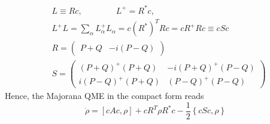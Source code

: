 \documentclass[a4paper,11pt]{article}
\theoremstyle{remark}
\newcommand{\ro}{\rho}
\newcommand{\nl}{\vskip 0.3cm}
\newcommand{\np}{\vskip 1.3cm}
\begin{document}
  \begin{subequations}
  \label{eq:quadr_lindb_majorana}
  \begin{align}
      &L    \equiv Rc, \quad \quad \quad \quad  L^+  = R^*c,\\
      &L^+L = \sum_{\alpha} L^+_{\alpha}L^{ }_{\alpha} = c(R^*)^TRc = cR^+Rc \equiv cSc \\[0.3 cm]
      &R = \left(\begin{array}{cc} P+Q & -i(P-Q)\end{array}\right) \\
      &S =\left(\begin{array}{cc} (P+Q)^+(P+Q) & -i(P+Q)^+(P-Q)\\i(P-Q)^+(P+Q)&(P-Q)^+(P-Q) \end{array}\right)
  \end{align} 
  \end{subequations}
  \nl Hence, the Majorana QME in the compact form reads
  \begin{equation}
   \label{eq:quadr_dyn_majorana}
   \dot{\ro}=\left[cAc,\ro\right]+cR^T\ro R^*c - \frac{1}{2}\left\{cSc,\ro\right\}
  \end{equation}
  \np
  
\end{document}
